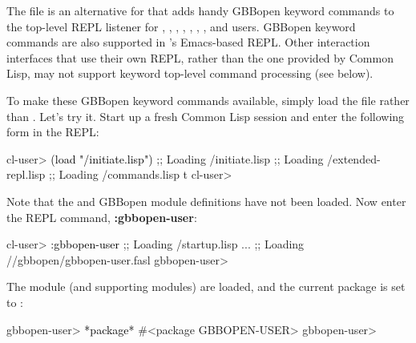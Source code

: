 \documentclass[10pt,twoside,english,pdftex]{article}
\begin{document}
The file  is an
alternative for  that adds
handy GBBopen keyword commands to the top-level REPL listener for
,
,
,
,
,
,
,
 and
users.  GBBopen keyword commands
are also supported in
's Emacs-based REPL.
Other interaction interfaces that use their own REPL, rather than the one
provided by Common Lisp, may not support keyword top-level command processing
(see below).

To make these GBBopen keyword commands available, simply load the file
 rather than
.  Let's try it.  Start up a fresh
Common Lisp session and enter the following form in the REPL:
%
\W\supp
\begin{example}
\textcolor{darkergray}{%
  cl-user> \textcolor{black}{(load "/initiate.lisp")}
  ;; Loading /initiate.lisp
  ;;  Loading /extended-repl.lisp
  ;;  Loading /commands.lisp
  t
  cl-user>}
\end{example}

%
Note that the  and GBBopen
module definitions have not been loaded.  Now enter the REPL
command, \textbf{:gbbopen-user}:
%
\W\supp
\begin{example}
\textcolor{darkergray}{%
  cl-user> \textcolor{black}{:gbbopen-user}
  ;; Loading /startup.lisp
     ...
  ;; Loading //gbbopen/gbbopen-user.fasl
  gbbopen-user>}
\end{example}
%
The  module (and supporting modules) are loaded, and the
current package is set to :
%
\W\supp\notpretop
\begin{example}
\textcolor{darkergray}{%
  gbbopen-user> \textcolor{black}{*package*}
  #<package GBBOPEN-USER>
  gbbopen-user>}
\end{example}
\end{document}
